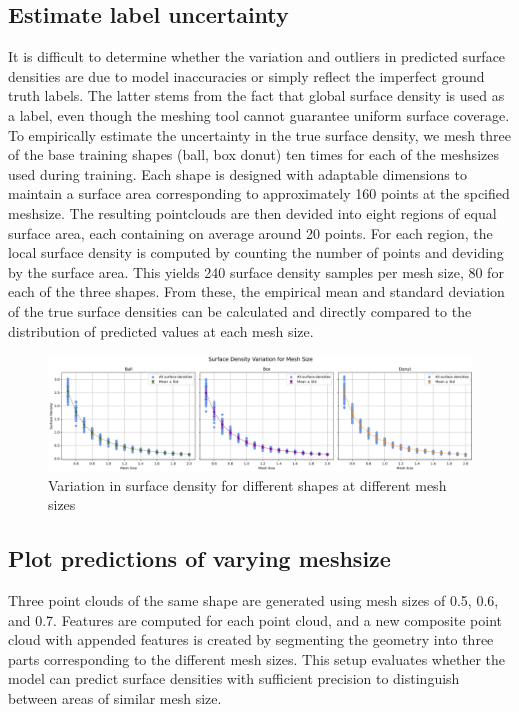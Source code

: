 \subsection*{Estimate label uncertainty}
It is difficult to determine whether the variation and outliers in predicted surface densities are due to model inaccuracies or simply reflect the imperfect ground truth labels. The latter stems from the fact that global surface density is used as a label, even though the meshing tool cannot guarantee uniform surface coverage.
To empirically estimate the uncertainty in the true surface density, we mesh three of the base training shapes (ball, box donut) ten times for each of the meshsizes used during training. Each shape is designed with adaptable dimensions to maintain a surface area corresponding to approximately 160 points at the spcified meshsize. The resulting pointclouds are then devided into eight regions of equal surface area, each containing on average around 20 points. For each region, the local surface density is computed by counting the number of points and deviding by the surface area. This yields 240 surface density samples per mesh size, 80 for each of the three shapes. From these, the empirical mean and standard deviation of the true surface densities can be calculated and directly compared to the distribution of predicted values at each mesh size.

\begin{figure}[h]
    \centering
    \includegraphics[width=\textwidth]{figures/sd_vs_mesh_lowQ.png}
    \caption{Variation in surface density for different shapes at different mesh sizes}
    \label{fig:sd_mesh}
\end{figure}

\subsection*{Plot predictions of varying meshsize}
Three point clouds of the same shape are generated using mesh sizes of 0.5, 0.6, and 0.7. Features are computed for each point cloud, and a new composite point cloud with appended features is created by segmenting the geometry into three parts corresponding to the different mesh sizes. This setup evaluates whether the model can predict surface densities with sufficient precision to distinguish between areas of similar mesh size.